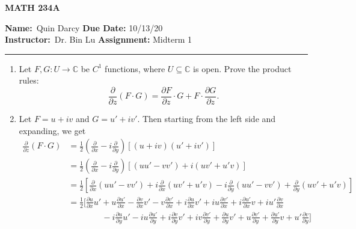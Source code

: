 \documentclass[12pt]{article}
\makeatletter
\theoremstyle{definition}
\theoremstyle{remark}
\renewenvironment{proof}[1][\proofname]{\par
  \pushQED{\qed}%
  \normalfont \topsep6\p@\@plus6\p@\relax
  \list{}{\leftmargin=0mm
          \rightmargin=4mm
          \settowidth{\itemindent}{\itshape#1}%
          \labelwidth=\itemindent
          \parsep=0pt \listparindent=\parindent 
  }
  \item[\hskip\labelsep
        \itshape
    #1\@addpunct{.}]\ignorespaces
}{%
  \popQED\endlist\@endpefalse
}
\let\oldproofname=\proofname
\renewcommand{\proofname}{\bf{\textit{\oldproofname}}}
\makeatother
\begin{document}
\thispagestyle{empty}\hline

\begin{center}
	\vspace{.4cm} {\textbf { \large MATH 234A}}
\end{center}
{\textbf{Name:}\ Quin Darcy \hspace{\fill} \textbf{Due Date:} 10/13/20   \\
{ \textbf{Instructor:}}\ Dr. Bin Lu \hspace{\fill} \textbf{Assignment:} Midterm 1 \\ \hrule}

\justifying
    \begin{enumerate}[leftmargin=*]
        \item Let $F,G\colon U\rightarrow\mathbb{C}$ be $C^1$ functions, where $U\subseteq\mathbb{C}$ is open. Prove the product rules:
            \begin{equation*}
                \frac{\partial}{\partial z}(F\cdot G)=\frac{\partial F}{\partial z}\cdot G+F\cdot\frac{\partial G}{\partial z}.
            \end{equation*}
            \begin{proof}
                Let $F=u+iv$ and $G=u'+iv'$. Then starting from the left side and expanding, we get
                    \begin{equation*}
                        \begin{split}
                            \frac{\partial}{\partial z}(F\cdot G) &=\frac{1}{2}\left(\frac{\partial}{\partial x}-i\frac{\partial}{\partial y}\right)[(u+iv)(u'+iv')] \\
                            &=\frac{1}{2}\left(\frac{\partial}{\partial x}-i\frac{\partial}{\partial y}\right)[(uu'-vv')+i(uv'+u'v)] \\
                            &=\frac{1}{2}\left[\frac{\partial}{\partial x}(uu'-vv')+i\frac{\partial}{\partial x}(uv'+u'v)-i\frac{\partial}{\partial y}(uu'-vv')+\frac{\partial}{\partial y}(uv'+u'v)\right] \\
                            &=\frac{1}{2}\bigg[\frac{\partial u}{\partial x}u'+u\frac{\partial u'}{\partial x}-\frac{\partial v}{\partial x}v'-v\frac{\partial v'}{\partial x}+i\frac{\partial u}{\partial x}v'+iu\frac{\partial v'}{\partial x}+i\frac{\partial u'}{\partial x}v+iu'\frac{\partial v}{\partial x}\\ &\quad\quad\quad\quad-i\frac{\partial u}{\partial y}u'-iu\frac{\partial u'}{\partial y}+i\frac{\partial v}{\partial y}v'+iv\frac{\partial v'}{\partial y}+\frac{\partial u}{\partial y}v'+u\frac{\partial v'}{\partial y}+\frac{\partial u'}{\partial y}v+u'\frac{\partial v}{\partial y} \bigg] \\

\end{split}
\end{equation*}
\end{proof}
\end{enumerate}
\end{document}
